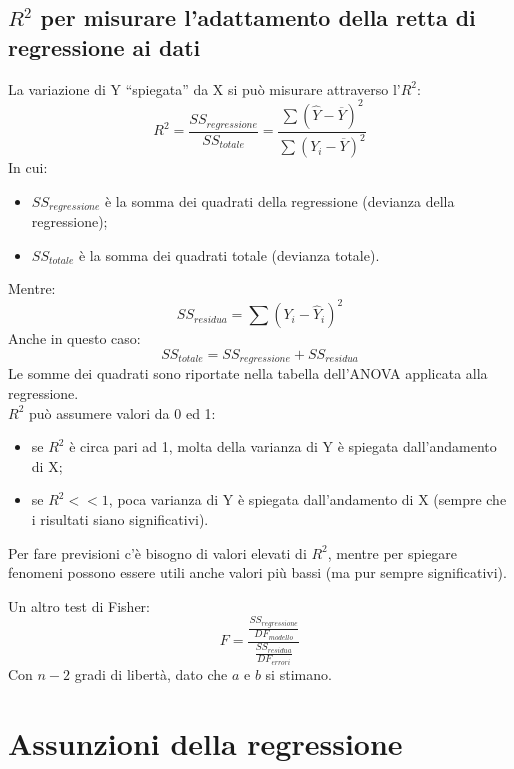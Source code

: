 \documentclass[10pt, draft]{book}
\newcommand{\tightlist}{%
\setlength{\itemsep}{1pt}\setlength{\parskip}{0pt}\setlength{\parsep}{0pt}}
\begin{document}
\subsection{\texorpdfstring{$R^2$}{Lg} per misurare l'adattamento della retta di regressione ai dati}

La variazione di Y ``spiegata'' da X si può misurare attraverso l'$R^2$:
\begin{equation}
    R^2 = \frac{SS_{regressione}}{SS_{totale}} = \frac{\sum(\hat{Y}-\overline{Y})^2}{\sum(Y_i-\overline{Y})^2}
\end{equation}
In cui:
\begin{itemize}\tightlist
    \item $SS_{regressione}$ è la somma dei quadrati della regressione (devianza della regressione);
    \item $SS_{totale}$ è la somma dei quadrati totale (devianza totale).
\end{itemize}
Mentre:
\begin{equation}
    SS_{residua} = \sum{(Y_i-\hat{Y}_i)^2}
\end{equation}
Anche in questo caso:
\begin{equation}
    SS_{totale} = SS_{regressione}+SS_{residua}
\end{equation}
Le somme dei quadrati sono riportate nella tabella dell'ANOVA applicata alla regressione.\\
$R^2$ può assumere valori da 0 ed 1:
\begin{itemize}\tightlist
    \item se $R^2$ è circa pari ad 1, molta della varianza di Y è spiegata dall'andamento di X;
    \item se $R^2 <<1$, poca varianza di Y è spiegata dall'andamento di X (sempre che i risultati siano significativi).
\end{itemize}
Per fare previsioni c'è bisogno di valori elevati di $R^2$, mentre per spiegare fenomeni possono essere utili anche valori più bassi (ma pur sempre significativi).

Un altro test di Fisher:
\begin{equation}
    F = \frac{\frac{SS_{regressione}}{DF_{modello}}}{\frac{SS_{residua}}{DF_{errori}}}
\end{equation}
Con $n-2$ gradi di libertà, dato che $a$ e $b$ si stimano.\\

\section{Assunzioni della regressione}
\end{document}
